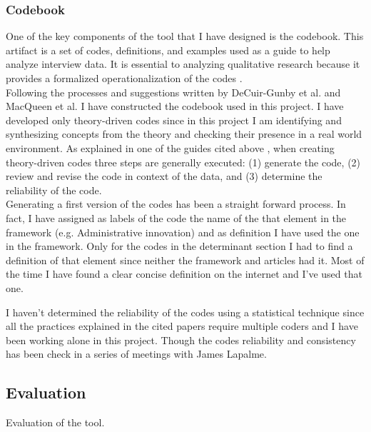 \subsubsection*{Codebook}
One of the key components of the tool that I have designed is the codebook. This artifact is a set of codes, definitions, and examples used as a guide to help analyze interview data. It is essential to analyzing qualitative research because it provides a formalized operationalization of the codes \citep{CodebookGuide}. \\
Following the processes and suggestions written by DeCuir-Gunby et al. \citep{CodebookGuide} and MacQueen et al. \citep{CodebookGuide2} I have constructed the codebook used in this project.
I have developed only theory-driven codes since in this project I am identifying and synthesizing concepts from the theory and checking their presence in a real world environment. As explained in one of the guides cited above \citep{CodebookGuide}, when creating theory-driven codes three steps are generally executed: (1) generate the code, (2) review and revise the code in context of the data, and (3) determine the reliability of the code. \\

Generating a first version of the codes has been a straight forward process. In fact, I have assigned as labels of the code the name of the that element in the framework (e.g. Administrative innovation) and as definition I have used the one in the framework. Only for the codes in the determinant section I had to find a definition of that element since neither the framework and articles had it. Most of the time I have found a clear concise definition on the internet and I've used that one.


I haven't determined the reliability of the codes using a statistical technique since all the practices explained in the cited papers require multiple coders and I have been working alone in this project. Though the codes reliability and consistency has been check in a series of meetings with James Lapalme.

\subsection{Evaluation}
Evaluation of the tool.


